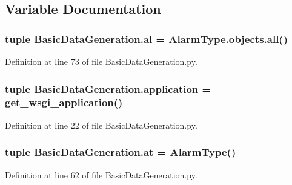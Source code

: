 \subsection{Variable Documentation}
\hypertarget{namespace_basic_data_generation_a5e76cdcb4d6408f8d15fabc84d4c29aa}{}
\subsubsection[{al}]{\setlength{\rightskip}{0pt plus 5cm}tuple Basic\+Data\+Generation.\+al = Alarm\+Type.\+objects.\+all()}\label{namespace_basic_data_generation_a5e76cdcb4d6408f8d15fabc84d4c29aa}


Definition at line 73 of file Basic\+Data\+Generation.\+py.

\hypertarget{namespace_basic_data_generation_ae5f818e308cadb95df893ff136a20bb1}{}
\subsubsection[{application}]{\setlength{\rightskip}{0pt plus 5cm}tuple Basic\+Data\+Generation.\+application = get\+\_\+wsgi\+\_\+application()}\label{namespace_basic_data_generation_ae5f818e308cadb95df893ff136a20bb1}


Definition at line 22 of file Basic\+Data\+Generation.\+py.

\hypertarget{namespace_basic_data_generation_a30af2a92704198b0c3b54ac635fa46e8}{}
\subsubsection[{at}]{\setlength{\rightskip}{0pt plus 5cm}tuple Basic\+Data\+Generation.\+at = {\bf Alarm\+Type}()}\label{namespace_basic_data_generation_a30af2a92704198b0c3b54ac635fa46e8}


Definition at line 62 of file Basic\+Data\+Generation.\+py.

\hypertarget{namespace_basic_data_generation_a9bbccf8a803bc653ecc2dde0c79ce638}{}
